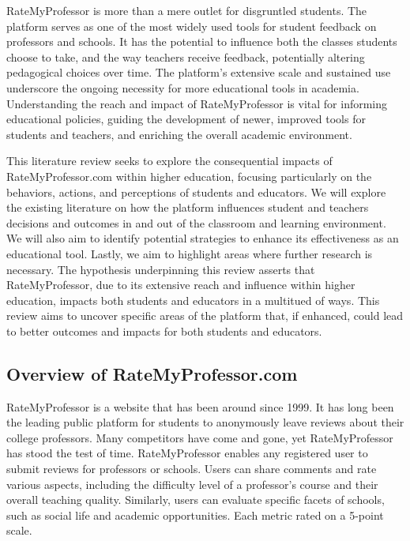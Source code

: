 \documentclass[man, 12pt]{apa7}
\begin{document}
RateMyProfessor is more than a mere outlet for disgruntled students. The platform serves as one of the most widely used tools for student feedback on professors and schools. It has the potential to influence both the classes students choose to take, and the way teachers receive feedback, potentially altering pedagogical choices over time.  The platform's extensive scale and sustained use underscore the ongoing necessity for more educational tools in academia. Understanding the reach and impact of RateMyProfessor is vital for informing educational policies, guiding the development of newer, improved tools for students and teachers, and enriching the overall academic environment.

This literature review seeks to explore the consequential impacts of RateMyProfessor.com within higher education, focusing particularly on the behaviors, actions, and perceptions of students and educators. We will explore the existing literature on how the platform influences student and teachers decisions and outcomes in and out of the classroom and learning environment. We will also aim to identify potential strategies to enhance its effectiveness as an educational tool. Lastly, we aim to highlight areas where further research is necessary. 
The hypothesis underpinning this review asserts that RateMyProfessor, due to its extensive reach and influence within higher education, impacts both students and educators in a multitued of ways. This review aims to uncover specific areas of the platform that, if enhanced, could lead to better outcomes and impacts for both students and educators.

\subsection{Overview of RateMyProfessor.com}
RateMyProfessor is a website that has been around since 1999. It has long been the leading public platform for students to anonymously leave reviews about their college professors. Many competitors have come and gone, yet RateMyProfessor has stood the test of time. 
RateMyProfessor enables any registered user to submit reviews for professors or schools. Users can share comments and rate various aspects, including the difficulty level of a professor's course and their overall teaching quality. Similarly, users can evaluate specific facets of schools, such as social life and academic opportunities. Each metric rated on a 5-point scale.
\end{document}
